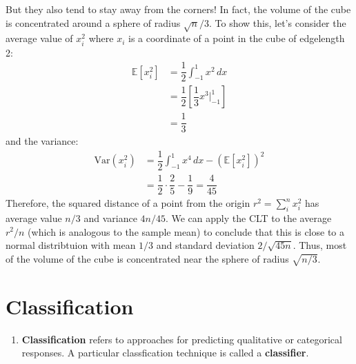 \documentclass[10pt]{article}
\newcommand{\EE}{{\mathbb{E}}}
\begin{document}
\begin{enumerate}
{	But they also tend to stay away from the corners!  In fact, the volume of the cube is concentrated around a sphere of radius $\sqrt{n}/3$.  To show this, let's consider the average value of $x_i^2$ where $x_i$ is a  coordinate of a point in the cube of edgelength 2:
	\begin{align*}
		\EE[x_i^2] &= \dfrac{1}{2} \int_{-1}^1 x^2 \, dx \\
		&= \dfrac{1}{2} \left[ \dfrac{1}{3} x^3 \Big|_{-1}^1 \right] \\
		&= \dfrac{1}{3} 	
	\end{align*}
	and the variance:
	\begin{align*}
		\mathrm{Var}(x_i^2) &= \dfrac{1}{2} \int_{-1}^1 x^4 \, dx - (\EE[x_i^2])^2 \\
		&= \dfrac{1}{2} \cdot \dfrac{2}{5} - \dfrac{1}{9} = \dfrac{4}{45}  
	\end{align*}
	Therefore, the squared distance of a point from the origin $r^2 = \sum_i^n x_i^2$ has average value $n/3$ and variance $4n/45$.  We can apply the CLT to the average $r^2 / n$ (which is analogous to the sample mean) to conclude that this is close to a normal distribtuion with mean $1/3$ and standard deviation $2/\sqrt{45n}$.  Thus, most of the volume of the cube is concentrated near the sphere of radius $\sqrt{n/3}$.
	}

\end{enumerate}

\vspace{.2in} 

\section{Classification} 
\begin{enumerate}
	\item \textbf{Classification} refers to approaches for predicting qualitative or categorical responses.  A particular classfication technique is called a \textbf{classifier}. 
\end{enumerate}
\vspace{.2in} 
\end{document}
